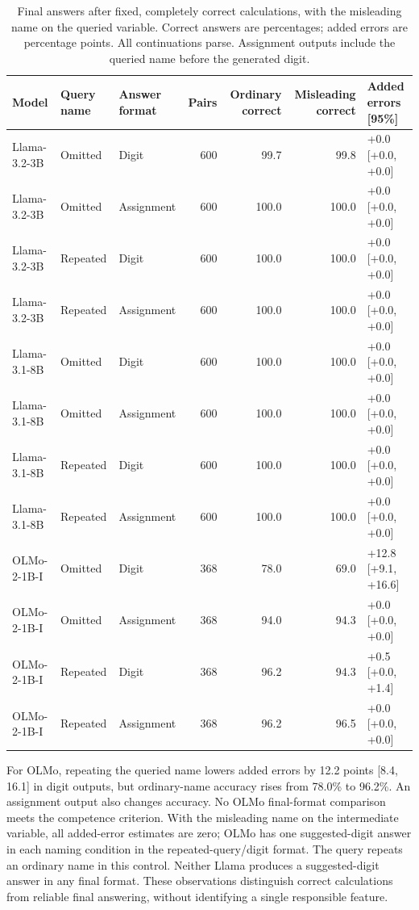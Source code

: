 \begin{table}[t]
\centering\small\setlength{\tabcolsep}{4pt}
\begin{tabular}{@{}lllrrrl@{}}
\toprule
Model & Query name & Answer format & Pairs & Ordinary correct & Misleading correct & Added errors [95\%] \\
\midrule
Llama-3.2-3B & Omitted & Digit & 600 & 99.7 & 99.8 & +0.0 [+0.0, +0.0] \\
Llama-3.2-3B & Omitted & Assignment & 600 & 100.0 & 100.0 & +0.0 [+0.0, +0.0] \\
Llama-3.2-3B & Repeated & Digit & 600 & 100.0 & 100.0 & +0.0 [+0.0, +0.0] \\
Llama-3.2-3B & Repeated & Assignment & 600 & 100.0 & 100.0 & +0.0 [+0.0, +0.0] \\
Llama-3.1-8B & Omitted & Digit & 600 & 100.0 & 100.0 & +0.0 [+0.0, +0.0] \\
Llama-3.1-8B & Omitted & Assignment & 600 & 100.0 & 100.0 & +0.0 [+0.0, +0.0] \\
Llama-3.1-8B & Repeated & Digit & 600 & 100.0 & 100.0 & +0.0 [+0.0, +0.0] \\
Llama-3.1-8B & Repeated & Assignment & 600 & 100.0 & 100.0 & +0.0 [+0.0, +0.0] \\
OLMo-2-1B-I & Omitted & Digit & 368 & 78.0 & 69.0 & +12.8 [+9.1, +16.6] \\
OLMo-2-1B-I & Omitted & Assignment & 368 & 94.0 & 94.3 & +0.0 [+0.0, +0.0] \\
OLMo-2-1B-I & Repeated & Digit & 368 & 96.2 & 94.3 & +0.5 [+0.0, +1.4] \\
OLMo-2-1B-I & Repeated & Assignment & 368 & 96.2 & 96.5 & +0.0 [+0.0, +0.0] \\
\bottomrule
\end{tabular}
\caption{Final answers after fixed, completely correct calculations, with the misleading name on the queried variable. Correct answers are percentages; added errors are percentage points. All continuations parse. Assignment outputs include the queried name before the generated digit.}
\label{tab:round7-final}
\end{table}
For OLMo, repeating the queried name lowers added errors by 12.2 points [8.4, 16.1] in digit outputs, but ordinary-name accuracy rises from 78.0\% to 96.2\%. An assignment output also changes accuracy. No OLMo final-format comparison meets the competence criterion. With the misleading name on the intermediate variable, all added-error estimates are zero; OLMo has one suggested-digit answer in each naming condition in the repeated-query/digit format. The query repeats an ordinary name in this control. Neither Llama produces a suggested-digit answer in any final format. These observations distinguish correct calculations from reliable final answering, without identifying a single responsible feature.
